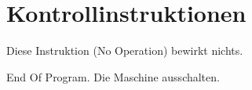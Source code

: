 \section{Kontrollinstruktionen}

Diese Instruktion (\glqq No Operation\grqq) bewirkt nichts.


\glqq End Of Program\grqq.
Die Maschine ausschalten.
